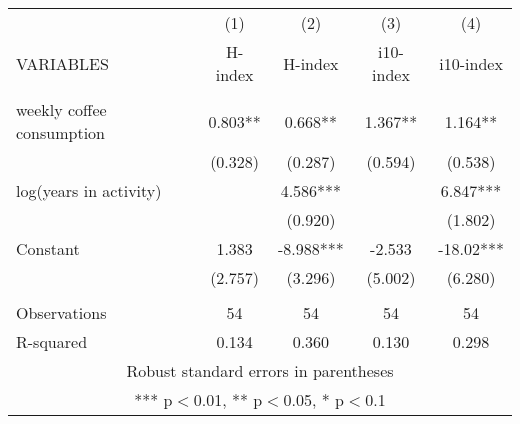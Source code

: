 \documentclass[]{article}
\begin{document}
\begin{tabular}{lcccc} \hline
 & (1) & (2) & (3) & (4) \\
VARIABLES & H-index & H-index & i10-index & i10-index \\ \hline
 &  &  &  &  \\
weekly coffee consumption & 0.803** & 0.668** & 1.367** & 1.164** \\
 & (0.328) & (0.287) & (0.594) & (0.538) \\
log(years in activity) &  & 4.586*** &  & 6.847*** \\
 &  & (0.920) &  & (1.802) \\
Constant & 1.383 & -8.988*** & -2.533 & -18.02*** \\
 & (2.757) & (3.296) & (5.002) & (6.280) \\
 &  &  &  &  \\
Observations & 54 & 54 & 54 & 54 \\
 R-squared & 0.134 & 0.360 & 0.130 & 0.298 \\ \hline
\multicolumn{5}{c}{ Robust standard errors in parentheses} \\
\multicolumn{5}{c}{ *** p$<$0.01, ** p$<$0.05, * p$<$0.1} \\
\end{tabular}
\end{document}
